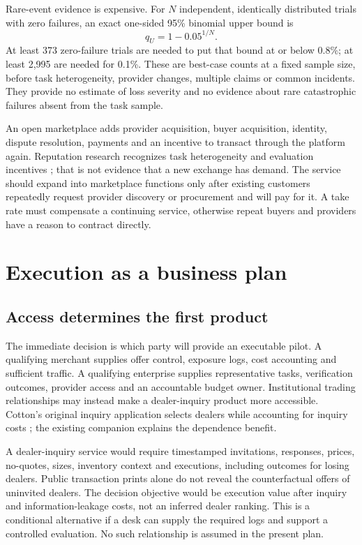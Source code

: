 \documentclass[11pt]{article}
\theoremstyle{remark}\newtheorem{example}{Example}
\begin{document}
Rare-event evidence is expensive. For $N$ independent, identically distributed
trials with zero failures, an exact one-sided 95\% binomial upper bound is
\begin{equation}\label{eq:zero}
 q_U=1-0.05^{1/N}.
\end{equation}
At least 373 zero-failure trials are needed to put that bound at or below
0.8\%; at least 2,995 are needed for 0.1\%. These are best-case counts at a
fixed sample size, before task heterogeneity, provider changes, multiple claims
or common incidents. They provide no estimate of loss severity and no evidence
about rare catastrophic failures absent from the task sample.

An open marketplace adds provider acquisition, buyer acquisition, identity,
dispute resolution, payments and an incentive to transact through the platform
again. Reputation research recognizes task heterogeneity and evaluation
incentives \citep{agentreputation}; that is not evidence that a new exchange
has demand. The service should expand into marketplace functions only after
existing customers repeatedly request provider discovery or procurement and
will pay for it. A take rate must compensate a continuing service, otherwise
repeat buyers and providers have a reason to contract directly.

\section{Execution as a business plan}
\subsection{Access determines the first product}
The immediate decision is which party will provide an executable pilot. A
qualifying merchant supplies offer control, exposure logs, cost accounting and
sufficient traffic. A qualifying enterprise supplies representative tasks,
verification outcomes, provider access and an accountable budget owner.
Institutional trading relationships may instead make a dealer-inquiry product
more accessible. Cotton's original inquiry application selects dealers while
accounting for inquiry costs \citep{cotton2021}; the existing companion explains
the dependence benefit.

A dealer-inquiry service would require timestamped invitations, responses,
prices, no-quotes, sizes, inventory context and executions, including outcomes
for losing dealers. Public transaction prints alone do not reveal the
counterfactual offers of uninvited dealers. The decision objective would be
execution value after inquiry and information-leakage costs, not an inferred
dealer ranking. This is a conditional alternative if a desk can supply the
required logs and support a controlled evaluation. No such relationship is
assumed in the present plan.
\end{document}
